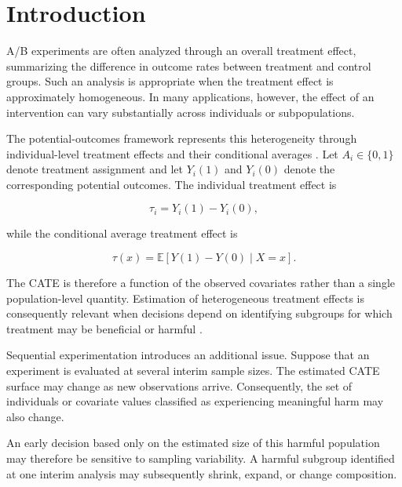 \documentclass[11pt,a4paper]{article}
\begin{document}

\section{Introduction}

A/B experiments are often analyzed through an overall treatment effect,
summarizing the difference in outcome rates between treatment and control
groups. Such an analysis is appropriate when the treatment effect is
approximately homogeneous. In many applications, however, the effect of an
intervention can vary substantially across individuals or subpopulations.

The potential-outcomes framework represents this heterogeneity through
individual-level treatment effects and their conditional averages
\cite{rubin1974}. Let $A_i\in\{0,1\}$ denote treatment assignment and let
$Y_i(1)$ and $Y_i(0)$ denote the corresponding potential outcomes. The
individual treatment effect is

\begin{equation}
\tau_i = Y_i(1)-Y_i(0),
\end{equation}

while the conditional average treatment effect is

\begin{equation}
\tau(x)
=
\mathbb{E}\left[
Y(1)-Y(0)\mid X=x
\right].
\end{equation}

The CATE is therefore a function of the observed covariates rather than a
single population-level quantity. Estimation of heterogeneous treatment
effects is consequently relevant when decisions depend on identifying
subgroups for which treatment may be beneficial or harmful
\cite{athey2016}.

Sequential experimentation introduces an additional issue. Suppose that an
experiment is evaluated at several interim sample sizes. The estimated CATE
surface may change as new observations arrive. Consequently, the set of
individuals or covariate values classified as experiencing meaningful harm
may also change.

An early decision based only on the estimated size of this harmful population
may therefore be sensitive to sampling variability. A harmful subgroup
identified at one interim analysis may subsequently shrink, expand, or change
composition.
\end{document}
